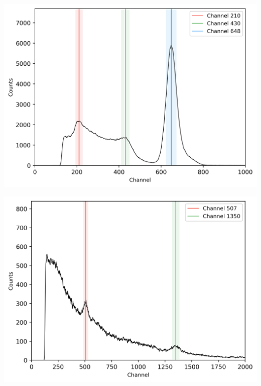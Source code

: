 \begin{center}
    \begin{adjustbox}{max width=\linewidth, keepaspectratio}
        \includegraphics[]{png/137Cs}
    \end{adjustbox}
    \label{fig:}
\end{center}
%
\begin{center}
    \begin{adjustbox}{max width=\linewidth, keepaspectratio}
        \includegraphics[]{png/night}
    \end{adjustbox}
    \label{fig:}
\end{center}
%
